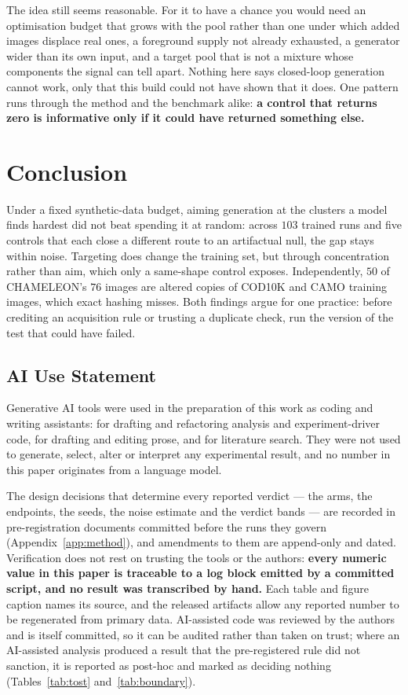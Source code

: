 \documentclass{article}
\begin{document}
The idea still seems reasonable. For it to have a chance you would need an optimisation budget that
grows with the pool rather than one under which added images displace real ones, a foreground supply
not already exhausted, a generator wider than its own input, and a target pool that is not a mixture
whose components the signal can tell apart. Nothing here says closed-loop generation cannot work,
only that this build could not have shown that it does. One pattern runs through the method and the
benchmark alike: \textbf{a control that returns zero is informative only if it could have returned
something else.}

\section{Conclusion}
\label{sec:conclusion}
Under a fixed synthetic-data budget, aiming generation at the clusters a model finds hardest did not
beat spending it at random: across $103$ trained runs and five controls that each close a different
route to an artifactual null, the gap stays within noise. Targeting does change the training set,
but through concentration rather than aim, which only a same-shape control exposes. Independently,
$50$ of CHAMELEON's $76$ images are altered copies of COD10K and CAMO training images, which exact
hashing misses. Both findings argue for one practice: before crediting an acquisition rule or
trusting a duplicate check, run the version of the test that could have failed.

\subsection*{AI Use Statement}

Generative AI tools were used in the preparation of this work as coding and writing assistants:
for drafting and refactoring analysis and experiment-driver code, for drafting and editing prose,
and for literature search. They were not used to generate, select, alter or interpret any
experimental result, and no number in this paper originates from a language model.

The design decisions that determine every reported verdict --- the arms, the endpoints, the seeds,
the noise estimate and the verdict bands --- are recorded in pre-registration documents
committed before the runs they govern (Appendix~\ref{app:method}), and amendments to them are
append-only and dated. Verification does not rest on trusting the tools or the authors:
\textbf{every numeric value in this paper is traceable to a log block emitted by a committed script,
and no result was transcribed by hand.} Each table and figure caption names its source, and the
released artifacts allow any reported number to be regenerated from primary data. AI-assisted code
was reviewed by the authors and is itself committed, so it can be audited rather than taken on
trust; where an AI-assisted analysis produced a result that the pre-registered rule did not
sanction, it is reported as post-hoc and marked as deciding nothing
(Tables~\ref{tab:tost} and~\ref{tab:boundary}).
\end{document}
